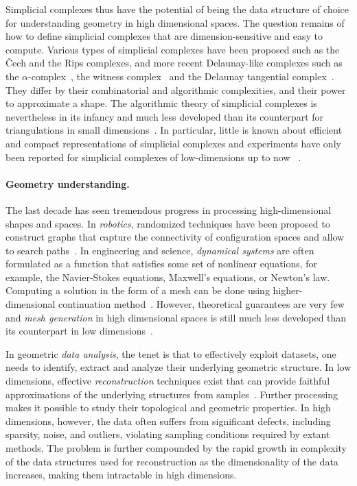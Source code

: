 Simplicial complexes thus have the potential of being the data structure of choice for understanding geometry in high dimensional spaces. The question remains of how to define simplicial complexes that are dimension-sensitive and easy to compute.  Various types of simplicial complexes have been proposed such as the \v{C}ech and the Rips complexes, and more recent Delaunay-like complexes such as the $\alpha$-complex~\cite{eks-sspp-83,he-ubds-95}, the witness complex~\cite{deSilva2008,cds-tewc-2004} and the Delaunay tangential complex~\cite{geometrica-7142i}. They differ by their combinatorial and algorithmic complexities, and their power to approximate a shape.  The algorithmic theory of simplicial complexes is nevertheless in its infancy and much less developed than its counterpart for triangulations in small dimensions~\cite{by-ag-98,he-gtmg-2001}. In particular, little is known about efficient and compact representations of simplicial complexes and experiments have only been reported for simplicial complexes of low-dimensions up to now ~\cite{geometrica-6743i,Attali2011,rg-bptd-2008}.  


\paragraph{Geometry understanding.}

The last decade has seen tremendous progress in processing high-dimensional shapes and spaces. In {\em robotics}, randomized techniques have been proposed to construct graphs that capture the connectivity of configuration spaces and allow to search paths~\cite{sml-pa-2006}. 
In engineering and science, {\em dynamical systems} are often formulated as a function that satisfies some set of nonlinear equations, for example, the Navier-Stokes equations, Maxwell's equations, or Newton's law. Computing a  solution in the form of a mesh can be done using
higher-dimensional continuation method~\cite{mh-mpc-2002}.  However, theoretical guarantees are very few~\cite{boissonnat2010meshing} and  {\em mesh generation} in high dimensional spaces is still much less developed than its counterpart in low dimensions~\cite{he-gtmg-2001,geometrica-ecg-book}.  

In geometric {\em data analysis}, the tenet is that to effectively exploit datasets, one needs to identify, extract and analyze their underlying geometric structure.  In low dimensions, effective {\em reconstruction} techniques exist that can provide faithful approximations of the underlying structures from samples~\cite{dey-csr-2007}. Further processing makes it possible to study their topological and geometric properties. In high dimensions, however, the data often suffers from significant defects, including sparsity, noise, and outliers, violating sampling conditions required by extant methods. The problem is further compounded by the rapid growth in complexity of the data structures used for reconstruction as the dimensionality of the data increases, making them intractable in high dimensions. 


